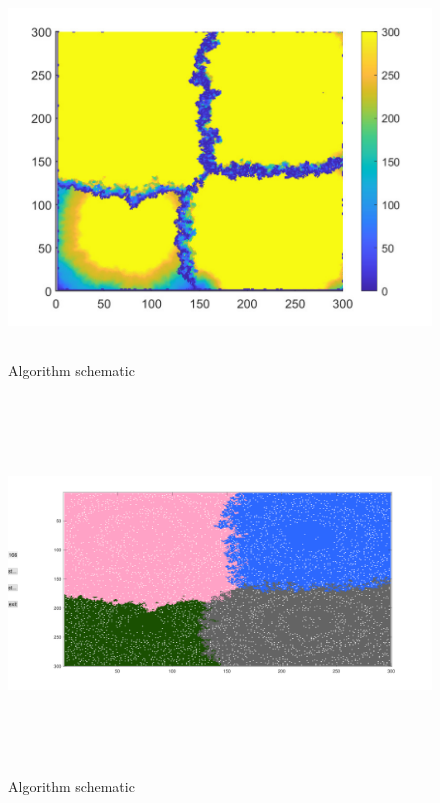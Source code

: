 \documentclass{mcmthesis}
\begin{document}
\begin{figure}[H] 
	\centering 
	\includegraphics[height=10cm]{./T5Figure/K4N1/K4N1A.pdf}
	\caption{Algorithm schematic}
\end{figure}
\begin{figure}[H] 
	\centering 
	\includegraphics[height=10cm]{./T5Figure/K4N1/K4N1F.pdf}
	\caption{Algorithm schematic}
\end{figure}
\end{document}
